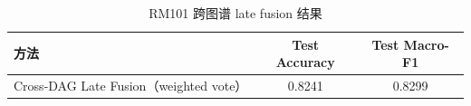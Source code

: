\begin{table}[!htbp]
\centering
\caption{RM101 跨图谱 late fusion 结果}
\label{tab:rm101_cross_dag_fusion}
\begin{tabular}{lcc}
\toprule
\textbf{方法} & \textbf{Test Accuracy} & \textbf{Test Macro-F1} \\
\midrule
Cross-DAG Late Fusion（weighted vote） & 0.8241 & 0.8299 \\
\bottomrule
\end{tabular}
\end{table}
